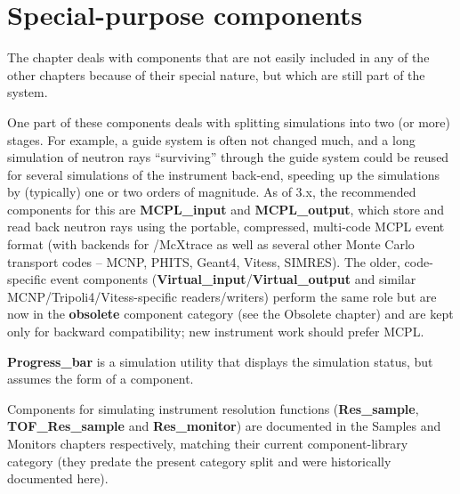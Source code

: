 \chapter{Special-purpose components}

The chapter deals with components that are not easily included
in any of the other chapters because of their special nature,
but which are still part of the \MCS system.

One part of these components deals with splitting simulations
into two (or more) stages. For example, a guide system is often
not changed much, and a long simulation of neutron rays
``surviving'' through the guide system could be reused
for several simulations of the instrument back-end, speeding up
the simulations by (typically) one or two orders of magnitude.
As of \MCS 3.x, the recommended components for this are
\textbf{MCPL\_input} and \textbf{MCPL\_output}, which store and read back
neutron rays using the portable, compressed, multi-code MCPL event format
(with backends for \MCS/McXtrace as well as several other Monte Carlo
transport codes -- MCNP, PHITS, Geant4, Vitess, SIMRES). The older,
code-specific event components (\textbf{Virtual\_input}/\textbf{Virtual\_output}
and similar MCNP/Tripoli4/Vitess-specific readers/writers) perform the same
role but are now in the \textbf{obsolete} component category (see the
Obsolete chapter) and are kept only for backward compatibility; new
instrument work should prefer MCPL.

\textbf{Progress\_bar} is a simulation utility that displays the simulation
status, but assumes the form of a component.

Components for simulating instrument resolution functions
(\textbf{Res\_sample}, \textbf{TOF\_Res\_sample} and \textbf{Res\_monitor})
are documented in the Samples and Monitors chapters respectively, matching
their current component-library category (they predate the present
category split and were historically documented here).

\newpage
